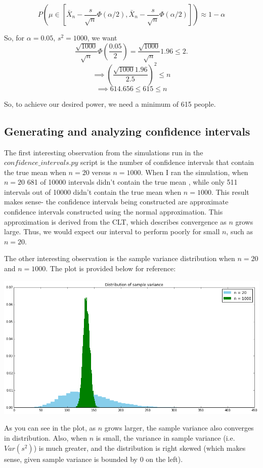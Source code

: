 \documentclass[paper=a4, fontsize=11pt]{scrartcl} %
\numberwithin{equation}{section} %
\numberwithin{figure}{section} %
\numberwithin{table}{section} %
\begin{document}
\[P\left(\mu \in \left[\bar{X}_n - \frac{s}{\sqrt{n}}\Phi(\alpha/2), \bar{X}_n - \frac{s}{\sqrt{n}}\Phi(\alpha/2)\right]\right) \approx 1 - \alpha\]

So, for $\alpha = 0.05$, $s^2 = 1000$, we want
\[\frac{\sqrt{1000}}{\sqrt{n}} \Phi(\frac{0.05}{2}) = \frac{\sqrt{1000}}{\sqrt{n}} 1.96 \leq 2.\]
\[\implies \left(\frac{\sqrt{1000}1.96}{2.5}\right)^2 \leq n \]
\[\implies 614.656 \leq 615 \leq n \]

So, to achieve our desired power, we need a minimum of 615 people.

\subsection{Generating and analyzing confidence intervals}

The first interesting observation from the simulations run in the $confidence\_intervals.py$ script is the number of confidence intervals that contain the true mean when $n=20$ versus $n=1000$. When I ran the simulation, when $n=20$ 681 of 10000 intervals didn't contain the true mean , while only 511 intervals out of 10000 didn't contain the true mean when $n=1000$. This result makes sense- the confidence intervals being constructed are approximate confidence intervals constructed using the normal approximation. This approximation is derived from the CLT, which describes convergence as $n$ grows large. Thus, we would expect our interval to perform poorly for small $n$, such as $n=20$.

The other interesting observation is the sample variance distribution when $n = 20$ and $n=1000$. The plot is provided below for reference:

\includegraphics[scale=0.5]{Q2c_fig}

As you can see in the plot, as $n$ grows larger, the sample variance also converges in distribution. Also, when $n$ is small, the variance in sample variance (i.e. $Var(s^2)$) is much greater, and the distribution is right skewed (which makes sense, given sample variance is bounded by 0 on the left).
\end{document}
